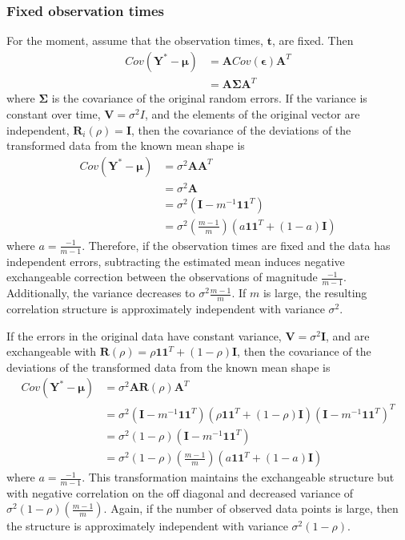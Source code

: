 \documentclass[12pt]{article}
\newcommand{\B}[0]{\mathbf}
\newcommand{\BS}[0]{\boldsymbol}
\begin{document}
\subsubsection{Fixed observation times}
For the moment, assume that the observation times, $\B t$, are fixed. Then
\begin{align*}
Cov(\B Y^{*} - \BS\mu)&= \B ACov(\BS\epsilon)\B A^{T}\\
&= \B A\BS\Sigma \B A^{T}
\end{align*}
where $\BS\Sigma$ is the covariance of the original random errors. If the variance is constant over time, $\B V=\sigma^{2}I$, and the elements of the original vector are independent, $\B R_{i}(\rho)=\B I$, then the covariance of the deviations of the transformed data from the known mean shape is
\begin{align*} 
Cov(\B Y^{*}- \BS\mu) &= \sigma^{2}\B A\B A^{T} \\
&=\sigma^{2}\B A\\
&= \sigma^{2}(\B I - m^{-1}\B1\B1^{T})\\
&=\sigma^{2}\left(\frac{m-1}{m}\right)(a\B 1\B 1^{T}+ (1-a)\B I)
\end{align*}
 where $a=\frac{-1}{m-1}$. Therefore, if the observation times are fixed and the data has independent errors, subtracting the estimated mean induces negative exchangeable correction between the observations of magnitude $\frac{-1}{m-1}$. Additionally, the variance decreases to $\sigma^{2}\frac{m-1}{m}$. If $m$ is large, the resulting correlation structure is approximately independent with variance $\sigma^{2}$.
 
 If the errors in the original data have constant variance, $\B V=\sigma^{2}\B I$, and are exchangeable with $\B R(\rho) = \rho\B 1 \B 1^{T} + (1-\rho)\B I$, then the covariance of the deviations of the transformed data from the known mean shape is
 \begin{align*}
 Cov(\B Y^{*}- \BS\mu) &= \sigma^{2}\B A\B R(\rho)\B A^{T}\\
 &= \sigma^{2}(\B I-m^{-1}\B1\B1^{T})(\rho\B1\B1^{T}+(1-\rho)\B I)(\B I-m^{-1}\B1\B1^{T})^{T}\\
 &= \sigma^{2}(1-\rho)(\B I-m^{-1}\B1\B1^{T})\\
 &=\sigma^{2}(1-\rho)\left(\frac{m-1}{m}\right)(a\B 1\B 1^{T}+ (1-a)\B I)
 \end{align*} 
 where $a=\frac{-1}{m-1}$. This transformation maintains the exchangeable structure but with negative correlation on the off diagonal and decreased variance of $\sigma^{2}(1-\rho)\left(\frac{m-1}{m}\right)$.  Again, if the number of observed data points is large, then the structure is approximately independent with variance $\sigma^{2}(1-\rho)$.
\end{document}
